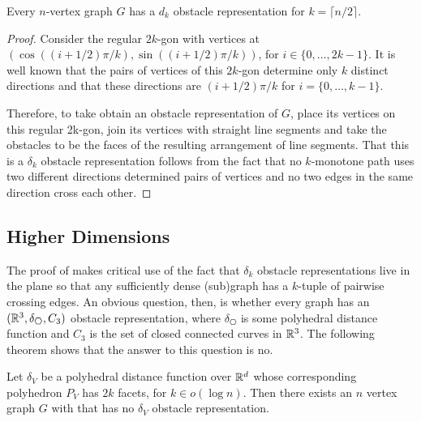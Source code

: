 \documentclass{patmorin}
\begin{document}
\begin{thm}
   Every $n$-vertex graph $G$ has a $d_k$ obstacle representation for $k=\lceil n/2\rceil$.
\end{thm}

\begin{proof}
   Consider the regular $2k$-gon with vertices at $(\cos((i+1/2)\pi/k),
   \sin((i+1/2)\pi/k))$, for $i\in\{0,\ldots,2k-1\}$.  It is well known
   that the pairs of vertices of this $2k$-gon determine only $k$
   distinct directions and that these directions are $(i+1/2)\pi/k$
   for $i=\{0,\ldots,k-1\}$.

   Therefore, to take obtain an obstacle representation of $G$, place
   its vertices on this regular 2k-gon, join its vertices with straight
   line segments and take the obstacles to be the faces of the resulting
   arrangement of line segments.  That this is a $\delta_k$ obstacle
   representation follows from the fact that no $k$-monotone path uses
   two different directions determined pairs of vertices and no two
   edges in the same direction cross each other.
\end{proof}

\subsection{Higher Dimensions}

The proof of  makes critical use of the
fact that $\delta_k$ obstacle representations live in the plane so
that any sufficiently dense (sub)graph has a $k$-tuple of pairwise
crossing edges. An obvious question, then, is whether every graph
has an $(\R^3,\delta_{\hexagon},C_3)$ obstacle representation, where
$\delta_{\hexagon}$ is some polyhedral distance function and $C_3$
is the set of closed connected curves in $\mathbb{R}^3$.  The following theorem
shows that the answer to this question is no.

\begin{thm}
  Let $\delta_V$ be a polyhedral distance function over $\mathbb{R}^d$ whose
  corresponding polyhedron $P_V$ has $2k$ facets, for $k\in o(\log n)$.
  Then there exists an $n$ vertex graph $G$ with that has no $\delta_V$
  obstacle representation.
\end{thm}
\end{document}
